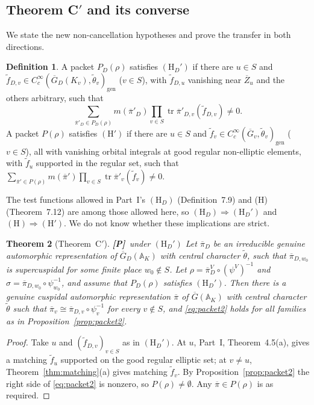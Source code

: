 \documentclass[12pt]{article}
\newcommand{\ov}[1]{\overline{#1}}
\newcommand{\A}{\mathbb{A}}
\newcommand{\gen}{\mathrm{gen}}
\newcommand{\tr}{\operatorname{tr}}
\newcommand{\Gb}{\ov{G}}
\newcommand{\Zb}{\ov{Z}}
\newcommand{\GDb}{\ov{G}_D}
\newcommand{\pib}{\ov{\pi}}
\newcommand{\Pv}{\textbf{[P]}}
\theoremstyle{plain}
\newtheorem{theorem}{Theorem}[section]
\theoremstyle{definition}
\newtheorem{definition}[theorem]{Definition}
\begin{document}
\subsection{Theorem C$'$ and its converse}\label{subsec:Cprime}
We state the new non-cancellation hypotheses and prove the transfer in both directions.

\begin{definition}\label{def:HDprime}
A packet $P_D(\rho)$ satisfies $(\mathrm H_D')$ if there are $u\in S$ and $\tilde f_{D,v}\in C_c^\infty(\GDb(K_v),\tilde\theta_v)_\gen$ ($v\in S$), with $\tilde f_{D,u}$ vanishing near $\Zb_u$ and the others arbitrary, such that
\[ \sum_{\pib'_D\in P_D(\rho)}m(\pib'_D)\prod_{v\in S}\tr\pib'_{D,v}(\tilde f_{D,v})\neq0 . \]
A packet $P(\rho)$ satisfies $(\mathrm H')$ if there are $u\in S$ and $\tilde f_v\in C_c^\infty(\Gb_v,\tilde\theta_v)_\gen$ ($v\in S$), all with vanishing orbital integrals at good regular non-elliptic elements, with $\tilde f_u$ supported in the regular set, such that $\sum_{\pib'\in P(\rho)}m(\pib')\prod_{v\in S}\tr\pib'_v(\tilde f_v)\ne0$.
\end{definition}

The test functions allowed in Part~I's $(\mathrm H_D)$ (Definition~7.9) and (H) (Theorem~7.12) are among those allowed here, so $(\mathrm H_D)\Rightarrow(\mathrm H_D')$ and $(\mathrm H)\Rightarrow(\mathrm H')$. We do not know whether these implications are strict.

\begin{theorem}[Theorem~C$'$]\label{thm:Cprime}\Pv\ under $(\mathrm H_D')$
Let $\pib_D$ be an irreducible genuine automorphic representation of $\GDb(\A_K)$ with central character $\tilde\theta$, such that $\pib_{D,w_0}$ is supercuspidal for some finite place $w_0\notin S$. Let $\rho=\pib_D^V\circ(\psi^V)^{-1}$ and $\sigma=\pib_{D,w_0}\circ\psi_{w_0}^{-1}$, and assume that $P_D(\rho)$ satisfies $(\mathrm H_D')$. Then there is a genuine cuspidal automorphic representation $\pib$ of $\Gb(\A_K)$ with central character $\tilde\theta$ such that $\pib_v\cong\pib_{D,v}\circ\psi_v^{-1}$ for every $v\notin S$, and \eqref{eq:packet2} holds for all families as in Proposition~\ref{prop:packet2}.
\end{theorem}
\begin{proof}
Take $u$ and $(\tilde f_{D,v})_{v\in S}$ as in $(\mathrm H_D')$. At $u$, Part~I, Theorem~4.5(a), gives a matching $\tilde f_u$ supported on the good regular elliptic set; at $v\ne u$, Theorem~\ref{thm:matching}(a) gives matching $\tilde f_v$. By Proposition~\ref{prop:packet2} the right side of \eqref{eq:packet2} is nonzero, so $P(\rho)\ne\emptyset$. Any $\pib\in P(\rho)$ is as required.
\end{proof}
\end{document}
